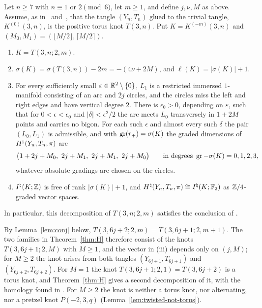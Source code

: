 \begin{theorem}\label{thm:H}
Let $n\ge7$ with $n\equiv1$ or $2\pmod6$, let $m\ge1$, and define $j,\nu,M$ as above. Assume, as in~\cite{HHK2}
and~\cite{WuebbenV}, that the tangle $(Y_n,T_n)$ glued to the trivial tangle, $K^{(0)}(3,n)$, is the positive torus knot
$T(3,n)$. Put $K=K^{(-m)}(3,n)$ and $(M_0,M_1)=(\lfloor M/2\rfloor,\lceil M/2\rceil)$.
\begin{enumerate}
\item[(i)] $K=T(3,n;2,m)$.
\item[(ii)] $\sigma(K)=\sigma(T(3,n))-2m=-(4\nu+2M)$, and $\ell(K)=|\sigma(K)|+1$.
\item[(iii)] For every sufficiently small $\varepsilon\in\mathbb{R}^2\setminus\{0\}$, $L_1$ is a restricted immersed
$1$-manifold consisting of an arc and $2j$ circles, and the circles miss the left and right edges and have
vertical degree $2$. There is $\epsilon_0>0$, depending on $\varepsilon$, such that for $0<\epsilon<\epsilon_0$ and $|\delta|<\epsilon^2/2$
the arc meets $L_0$ transversely in $1+2M$ points and carries no bigon. For each such $\epsilon$ and almost every
such $\delta$ the pair $(L_0,L_1)$ is admissible, and with $\operatorname{gr}(r_+)=\sigma(K)$ the graded dimensions of
$H^{\natural}(Y_n,T_n,\pi)$ are
\[
\bigl(1+2j+M_0,\ 2j+M_1,\ 2j+M_1,\ 2j+M_0\bigr)\qquad\text{in degrees }\gr-\sigma(K)=0,1,2,3,
\]
whatever absolute gradings are chosen on the circles.
\item[(iv)] $I^{\natural}(K;\mathbb{Z})$ is free of rank $|\sigma(K)|+1$, and $H^{\natural}(Y_n,T_n,\pi)\cong I^{\natural}(K;\mathbb{F}_2)$ as
$\mathbb{Z}/4$-graded vector spaces.
\end{enumerate}
In particular, this decomposition of $T(3,n;2,m)$ satisfies the conclusion of \cite[Conj.~6.5]{HHK2}.
\end{theorem}

\begin{remark}\label{rem:twisted-overlap}
By Lemma~\ref{lem:conj} below, $T(3,6j+2;2,m)=T(3,6j+1;2,m+1)$. The two families in Theorem~\ref{thm:H}
therefore consist of the knots $T(3,6j+1;2,M)$ with $M\ge1$, and the vector in (iii) depends only on
$(j,M)$; for $M\ge2$ the knot arises from both tangles $(Y_{6j+1},T_{6j+1})$ and $(Y_{6j+2},T_{6j+2})$. For $M=1$
the knot $T(3,6j+1;2,1)=T(3,6j+2)$ is a torus knot, and Theorem~\ref{thm:H} gives a second decomposition of
it, with the homology found in \cite{WuebbenV}. For $M\ge2$ the knot is neither a torus knot, nor alternating,
nor a pretzel knot $P(-2,3,q)$ (Lemma~\ref{lem:twisted-not-torus}).
\end{remark}

